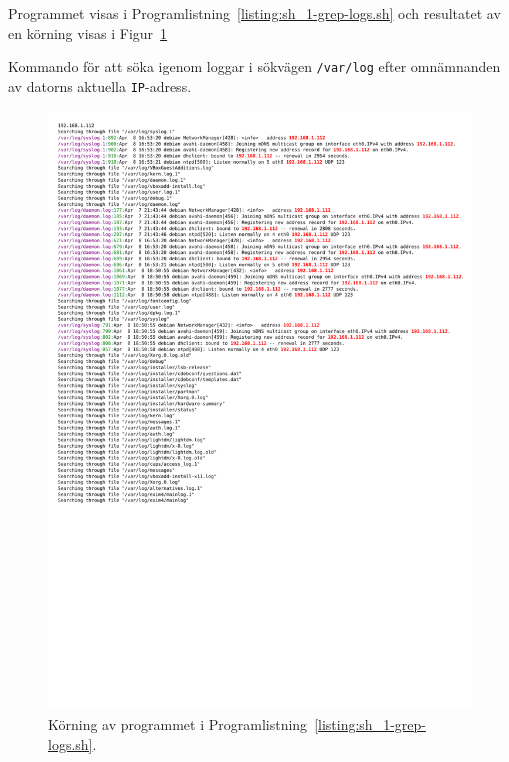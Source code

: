 Programmet visas i Programlistning~\ref{listing:sh_1-grep-logs.sh} och
resultatet av en körning visas i
Figur~\ref{fig:sh_1-grep-logs.sh_output}

\begin{listing}[H]
  \caption{Kommando för att söka igenom loggar i sökvägen \texttt{/var/log}
           efter omnämnanden av datorns aktuella \texttt{IP}-adress.}
  \label{listing:sh_1-grep-logs.sh}
\end{listing}

\begin{figure}[htp]
  \centering
  \includegraphics[scale=0.85]{include/sh_1-grep-logs-sh_output.pdf}
  \caption{Körning av programmet i Programlistning~\ref{listing:sh_1-grep-logs.sh}.}
  \label{fig:sh_1-grep-logs.sh_output}
\end{figure}

